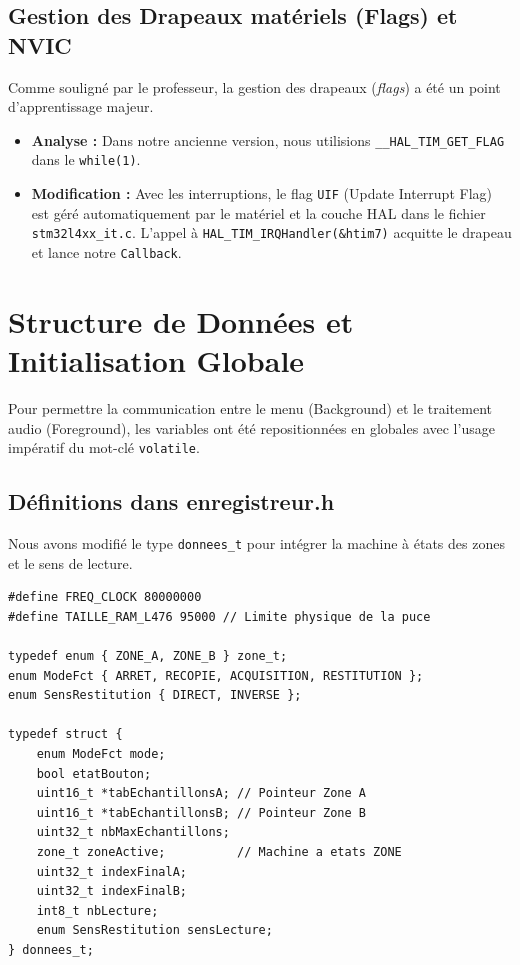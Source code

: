 \documentclass{article}
\begin{document}
\subsection{Gestion des Drapeaux matériels (Flags) et NVIC}
Comme souligné par le professeur, la gestion des drapeaux (\textit{flags}) a été un point d'apprentissage majeur. 
\begin{itemize}
    \item \textbf{Analyse :} Dans notre ancienne version, nous utilisions \texttt{\_\_HAL\_TIM\_GET\_FLAG} dans le \texttt{while(1)}. 
    \item \textbf{Modification :} Avec les interruptions, le flag \texttt{UIF} (Update Interrupt Flag) est géré automatiquement par le matériel et la couche HAL dans le fichier \texttt{stm32l4xx\_it.c}. L'appel à \texttt{HAL\_TIM\_IRQHandler(\&htim7)} acquitte le drapeau et lance notre \texttt{Callback}.
\end{itemize}

\section{Structure de Données et Initialisation Globale}

Pour permettre la communication entre le menu (Background) et le traitement audio (Foreground), les variables ont été repositionnées en globales avec l'usage impératif du mot-clé \texttt{volatile}.

\subsection{Définitions dans enregistreur.h}
Nous avons modifié le type \texttt{donnees\_t} pour intégrer la machine à états des zones et le sens de lecture.

\begin{lstlisting}[caption={Extrait de enregistreur.h}]
#define FREQ_CLOCK 80000000
#define TAILLE_RAM_L476 95000 // Limite physique de la puce

typedef enum { ZONE_A, ZONE_B } zone_t;
enum ModeFct { ARRET, RECOPIE, ACQUISITION, RESTITUTION };
enum SensRestitution { DIRECT, INVERSE };

typedef struct {
    enum ModeFct mode;
    bool etatBouton;
    uint16_t *tabEchantillonsA; // Pointeur Zone A
    uint16_t *tabEchantillonsB; // Pointeur Zone B
    uint32_t nbMaxEchantillons;
    zone_t zoneActive;          // Machine a etats ZONE
    uint32_t indexFinalA;       
    uint32_t indexFinalB;       
    int8_t nbLecture;           
    enum SensRestitution sensLecture; 
} donnees_t;
\end{lstlisting}
\end{document}
